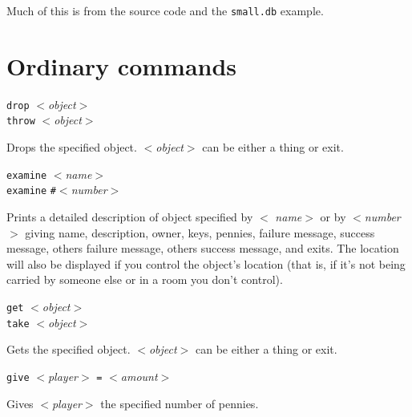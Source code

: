 Much of this is from the {\tinymud} source code and the {\tt small.db}
example.

\section{Ordinary commands}
\label{sec:ordinary-commands}

\begin{simple}

\item[]
\begin{flushleft}
{\tt drop} $<${\em object\/}$>$ \\
{\tt throw} $<${\em object\/}$>$
\end{flushleft}
Drops the specified object.  $<${\em object\/}$>$ can be either a
thing or exit.

\dorule

\item[]
\begin{flushleft}
{\tt examine} $<${\em name\/}$>$ \\
{\tt examine} {\tt \#}$<${\em number\/}$>$
\end{flushleft}
Prints a detailed description of object specified by $<${\em
name\/}$>$ or by $<${\em number\/}$>$ giving name, description, owner,
keys, pennies, failure message, success message, others failure
message, others success message, and exits.  The location will also be
displayed if you control the object's location (that is, if it's not
being carried by someone else or in a room you don't control).

\dorule

\item[]
\begin{flushleft}
{\tt get} $<${\em object\/}$>$ \\
{\tt take} $<${\em object\/}$>$
\end{flushleft}
Gets the specified object.  $<${\em object\/}$>$ can be either a thing
or exit.

\dorule

\item[]
\begin{flushleft}
{\tt give} $<${\em player\/}$>$ \verb|=| $<${\em amount\/}$>$
\end{flushleft}
Gives $<${\em player\/}$>$ the specified number of pennies.


\end{simple}
